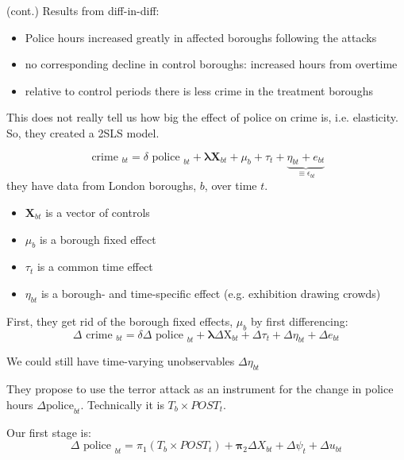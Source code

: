 \documentclass[11pt]{article}
\begin{document}
\begin{example}
    (cont.) Results from diff-in-diff:

    \begin{itemize}
        \item Police hours increased greatly in affected boroughs following the attacks
        \item no corresponding decline in control boroughs: increased hours from overtime
        \item relative to control periods there is less crime in the treatment boroughs
    \end{itemize}
    This does not really tell us how big the effect of police on crime is, i.e. elasticity. So, they created a 2SLS model.

    \begin{equation}
\text { crime }_{b t}=\delta \text { police }_{b t}+\boldsymbol{\lambda} \mathbf{X}_{b t}+\mu_b+\tau_t+\underbrace{\eta_{b t}+e_{b t}}_{\equiv \epsilon_{b t}}
\end{equation}
they have data from London boroughs, $b$, over time $t$.
\begin{itemize}
    \item $\boldsymbol{X}_{bt}$ is a vector of controls
    \item $\mu_b$ is a borough fixed effect
    \item $\tau_t$ is a common time effect
    \item $\eta_{bt}$ is a borough- and time-specific effect (e.g. exhibition drawing crowds)
\end{itemize}

First, they get rid of the borough fixed effects, $\mu_b$ by first differencing:
\begin{equation}
\Delta \text { crime }_{b t}=\delta \Delta \text { police }_{b t}+\boldsymbol{\lambda} \Delta \mathrm{X}_{b t}+\Delta \tau_t+\Delta \eta_{b t}+\Delta e_{b t}
\end{equation}
\begin{note}
    We could still have time-varying unobservables $\Delta \eta_{bt}$
\end{note}
They propose to use the terror attack as an instrument for the change in police hours $\Delta \text{police}_{bt}$. Technically it is $T_b \times POST_t$.

Our first stage is:
\begin{equation}
\Delta \text { police }_{b t}=\pi_1\left(T_b \times P O S T_t\right)+\boldsymbol{\pi}_2 \Delta X_{b t}+\Delta \psi_t+\Delta u_{b t}
\end{equation}


\end{example}
\end{document}
